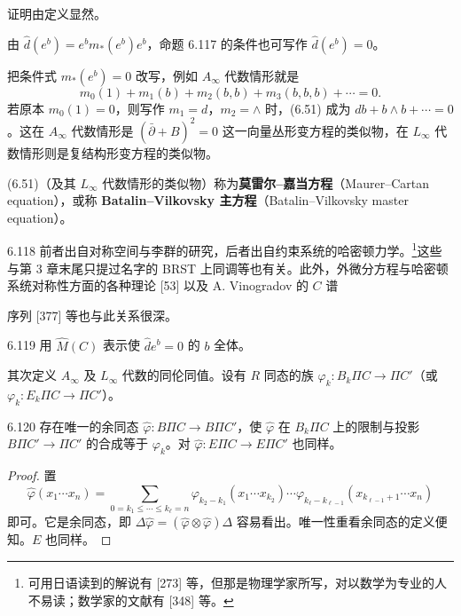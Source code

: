 证明由定义显然。

由 $\hat d(e^b)=e^bm_*(e^b)e^b$，命题 6.117 的条件也可写作 $\hat d(e^b)=0$。

把条件式 $m_*(e^b)=0$ 改写，例如 $A_{\infty}$ 代数情形就是
\begin{equation}
  m_0(1)+m_1(b)+m_2(b,b)+m_3(b,b,b)+\cdots=0. \tag{6.51}
\end{equation}
若原本 $m_0(1)=0$，则写作 $m_1=d$，$m_2=\wedge$ 时，(6.51) 成为 $db+b\wedge b+\cdots=0$。这在 $A_{\infty}$ 代数情形是 $(\bar\partial+B)^2=0$ 这一向量丛形变方程的类似物，在 $L_{\infty}$ 代数情形则是复结构形变方程的类似物。

(6.51)（及其 $L_{\infty}$ 代数情形的类似物）称为\textbf{莫雷尔–嘉当方程}（Maurer–Cartan equation），或称 \textbf{Batalin–Vilkovsky 主方程}（Batalin–Vilkovsky master equation）。

\begin{remark}{6.118}
  前者出自对称空间与李群的研究，后者出自约束系统的哈密顿力学。\footnote{可用日语读到的解说有 [273] 等，但那是物理学家所写，对以数学为专业的人不易读；数学家的文献有 [348] 等。}这些与第 3 章末尾只提过名字的 BRST 上同调等也有关。此外，外微分方程与哈密顿系统对称性方面的各种理论 [53] 以及 A. Vinogradov 的 $C$ 谱

序列 [377] 等也与此关系很深。
\end{remark}

\begin{definition}{6.119}
  用 $\hat M(C)$ 表示使 $\hat de^b=0$ 的 $b$ 全体。
\end{definition}

其次定义 $A_{\infty}$ 及 $L_{\infty}$ 代数的同伦同值。设有 $R$ 同态的族 $\varphi_k\colon B_k\Pi C\to\Pi C'$（或 $\varphi_k\colon E_k\Pi C\to\Pi C'$）。

\begin{lemma*}{6.120}
  存在唯一的余同态 $\hat\varphi\colon B\Pi C\to B\Pi C'$，使 $\hat\varphi$ 在 $B_k\Pi C$ 上的限制与投影 $B\Pi C'\to\Pi C'$ 的合成等于 $\varphi_k$。对 $\hat\varphi\colon E\Pi C\to E\Pi C'$ 也同样。
\end{lemma*}

\begin{proof}
  置
  \[
    \hat\varphi(x_1\cdots x_n)=\sum_{0=k_1\le\cdots\le k_\ell=n}
    \varphi_{k_2-k_1}(x_1\cdots x_{k_2})\cdots\varphi_{k_\ell-k_{\ell-1}}(x_{k_{\ell-1}+1}\cdots x_n)
  \]
  即可。它是余同态，即 $\Delta\hat\varphi=(\hat\varphi\otimes\hat\varphi)\Delta$ 容易看出。唯一性重看余同态的定义便知。$E$ 也同样。
\end{proof}

